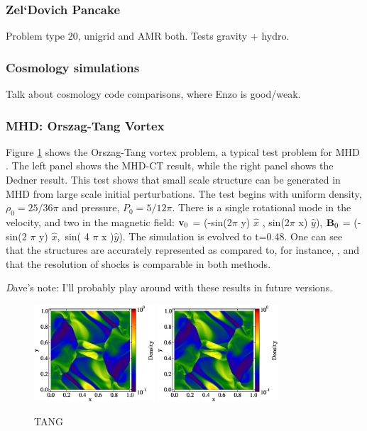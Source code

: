 \subsubsection{Zel`Dovich Pancake}
\label{sec.tests.pancake}
Problem type 20, unigrid and AMR both.  Tests gravity + hydro.

\subsubsection{Cosmology simulations}
\label{sec.tests.}
Talk about cosmology code comparisons, where Enzo is good/weak.

\subsubsection{MHD: Orszag-Tang Vortex}
\label{sec.tests.mhd}
Figure \ref{fig.orszag} shows the Orszag-Tang vortex problem, a typical test
problem for MHD \citep{Orszag79}.  The left panel shows the MHD-CT result, while
the right panel shows the Dedner result.  This test shows that small scale structure
can be generated in MHD from large scale initial perturbations.  
The test begins 
with uniform density, $\rho_0=25/36 \pi$ and pressure, $P_0=5/12 \pi$.  There is
a single rotational mode in the velocity, and two in the magnetic field: 
${\bf v}_0 $ = (-sin(2$\pi$ y) $ \hat{x}$ , sin(2$\pi$ x) $\hat{y}$),
${\bf B}_0$  =  (-sin(2 $\pi$ y) $ \hat{x},$ sin( 4 $\pi$ x )$\hat{y}$).  The
simulation is evolved to t=0.48.  One can see that the structures are accurately
represented as compared to, for instance, \citet{Toth00}, and that the
resolution of shocks is comparable in both methods.  

{\emph Dave's note:  I'll probably play around with these results in future
versions.}

\begin{figure}
\begin{center}
\includegraphics[width=0.4\textwidth]{figures/MHDCT_OrszagTang_Density.eps}
\includegraphics[width=0.4\textwidth]{figures/MHDDedner_OrszagTang_Density.eps}
\caption{TANG}
\label{fig.orszag}
\end{center}
\end{figure}


